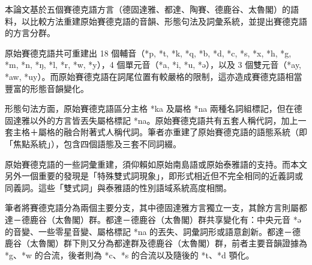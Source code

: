 \vspace{-1.15cm}
本論文基於五個賽德克語方言（德固達雅、都達、陶賽、德鹿谷、太魯閣）的語料，以比較方法重建原始賽德克語的音韻、形態句法及詞彙系統，並提出賽德克語的方言分群。

原始賽德克語共可重建出 18 個輔音（*p, *t, *k, *q, *b, *d, *c, *s, *x, *h, *g, *m, *n, *ŋ, *l, *r, *w, *y），4 個單元音（*a, *i, *u, *ə），以及 3 個雙元音（*ay, *aw, *uy）。而原始賽德克語在詞尾位置有較嚴格的限制，這亦造成賽德克語相當豐富的形態音韻變化。

形態句法方面，原始賽德克語區分主格 *ka 及屬格 *na 兩種名詞組標記，但在德固達雅以外的方言皆丟失屬格標記 *na。原始賽德克語共有五套人稱代詞，加上一套主格＋屬格的融合附著式人稱代詞。筆者亦重建了原始賽德克語的語態系統（即「焦點系統」），包含四個語態及三套不同詞綴。

原始賽德克語的一些詞彙重建，須仰賴如原始南島語或原始泰雅語的支持。而本文另外一個重要的發現是「特殊雙式詞現象」，即形式相近但不完全相同的近義詞或同義詞。這些「雙式詞」與泰雅語的性別語域系統高度相關。

筆者將賽德克語分為兩個主要分支，其中德固達雅方言獨立一支，其餘方言則屬都達－德鹿谷（太魯閣）群。都達－德鹿谷（太魯閣）群共享變化有：中央元音 *ə 的音變、一些零星音變、屬格標記 *na 的丟失、詞彙詞形或語意創新。都達－德鹿谷（太魯閣）群下則又分為都達群及德鹿谷（太魯閣）群，前者主要音韻證據為 *g、*w 的合流，後者則為 *c、*s 的合流以及隨後的 *t、*d 顎化。
